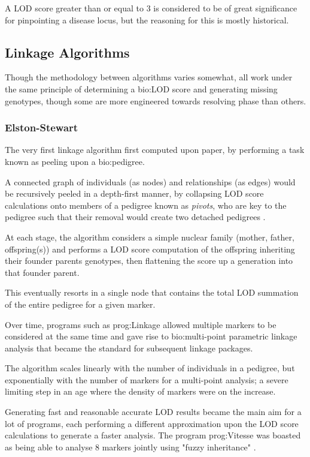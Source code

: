 A LOD score greater than or equal to 3 is considered to be of great significance for pinpointing a disease locus, but the reasoning for this is mostly historical.

\subsection{Linkage Algorithms}

Though the methodology between algorithms varies somewhat, all work under the same principle of determining a \gls{bio:LOD} score and generating missing genotypes, though some are more engineered towards resolving phase than others.

\subsubsection{Elston-Stewart}\label{ref:back:els}

The very first linkage algorithm first computed upon paper, by performing a task known as peeling upon a \gls{bio:pedigree}.

A connected graph of individuals (as nodes) and relationships (as edges) would be recursively peeled in a depth-first manner, by collapsing LOD score calculations onto members of a pedigree known as \textit{pivots}, who are key to the pedigree such that their removal would create two detached pedigrees \cite{elston}. 

At each stage, the algorithm considers a simple nuclear family (mother, father, offspring(s)) and performs a LOD score computation of the offspring inheriting their founder parents genotypes, then flattening the score up a generation into that founder parent.

This eventually resorts in a single node that contains the total LOD summation of the entire pedigree for a given marker.

Over time, programs such as \gls{prog:Linkage} allowed multiple markers to be considered at the same time and gave rise to \gls{bio:multi-point parametric} linkage analysis that became the standard for subsequent linkage packages.

The algorithm scales linearly with the number of individuals in a pedigree, but exponentially with the number of markers for a multi-point analysis; a severe limiting step in an age where the density of markers were on the increase.

Generating fast and reasonable accurate LOD results became the main aim for a lot of programs, each performing a different approximation upon the LOD score calculations to generate a faster analysis. The program \gls{prog:Vitesse} was boasted as being able to analyse 8 markers jointly using "fuzzy inheritance" \cite{o1995vitesse}.

